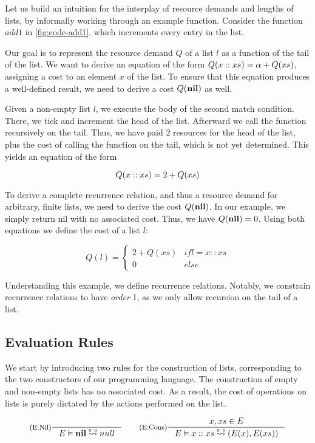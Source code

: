 Let us build an intuition for the interplay of resource demands and lengths of lists, by informally working through an example function. Consider the function \(add1\) in \cref{fig:code-add1}, which increments every entry in the list.

Our goal is to represent the resource demand \(Q\) of a list \(l\) as a function of the tail of the list. We want to derive an equation of the form \(Q(x :: xs) = \alpha + Q(xs)\), assigning a cost to an element \(x\) of the list. To ensure that this equation produces a well-defined result, we need to derive a cost \(Q(\textbf{nil})\) as well.

Given a non-empty list \(l\), we execute the body of the second match condition. There, we tick and increment the head of the list. Afterward we call the function recursively on the tail. Thus, we have paid \(2\) resources for the head of the list, plus the cost of calling the function on the tail, which is not yet determined. This yields an equation of the form 

\[
   Q(x :: xs) = 2 + Q(xs)
\]


To derive a complete recurrence relation, and thus a resource demand for arbitrary, finite lists, we need to derive the cost \(Q(\textbf{nil})\). In our example, we simply return nil with no associated cost. Thus, we have \(Q(\textbf{nil}) = 0\). Using both equations we define the cost of a list \(l\):

\[
   Q(l) = \begin{cases*}
      2 + Q(xs)            & if l = x :: xs\\
      0                    & else
   \end{cases*}
\]

Understanding this example, we define recurrence relations. Notably, we constrain recurrence relations to have \emph{order} 1, as we only allow recursion on the tail of a list. 


\subsection{Evaluation Rules}

We start by introducing two rules for the construction of lists, corresponding to the two constructors of our programming language. The construction of empty and non-empty lists has no associated cost. As a result, the cost of operations on lists is purely dictated by the actions performed on the list. 

\[
   \inference[(E:Nil)]
   {}
   {\evals{E}{\listnil}{null}{0}{0}}
   \qquad
   \inference[(E:Cons)]
   {\contains{E}{x, xs}}
   {\evals{E}{\cons{x}{xs}}{(E(x), E(xs))}{0}{0}}
\]

